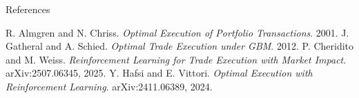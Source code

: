 \documentclass[11pt]{beamer}
\begin{document}
	\begin{frame}[allowframebreaks]{References}
		\tiny
		
		\begin{thebibliography}{9}
			 R. Almgren and N. Chriss. \emph{Optimal Execution of Portfolio Transactions}. 2001.
			 J. Gatheral and A. Schied. \emph{Optimal Trade Execution under GBM}. 2012.
			 P. Cheridito and M. Weiss. \emph{Reinforcement Learning for Trade Execution with Market Impact}. arXiv:2507.06345, 2025.
			 Y. Hafsi and E. Vittori. \emph{Optimal Execution with Reinforcement Learning}. arXiv:2411.06389, 2024.
		\end{thebibliography}
	\end{frame}
	
\end{document}
